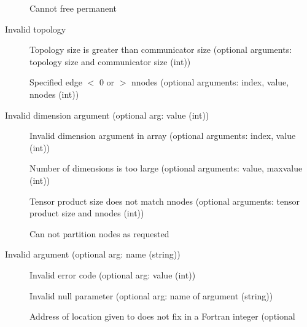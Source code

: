 \begin{description}
\begin{description}
    \item[ ]Cannot free
    permanent  
    \end{description}
\item[\mpiconst{MPI_ERR_TOPOLOGY} \emsg{topology}]Invalid topology
    \begin{description}
    \item[
    ]Topology size is greater than 
      communicator size (optional arguments: topology size and communicator
      size (int))
    \item[
    ]Specified edge $<$ 0 
      or $>$ nnodes (optional arguments: index, value, nnodes (int))
    \end{description}
\item[\mpiconst{MPI_ERR_DIMS} \emsg{dims}]Invalid dimension argument
    (optional arg: value (int)) 
    \begin{description}
    \item[ ]Invalid
    dimension argument in array 
      (optional arguments: index, value (int))
    \item[ ]Number of
    dimensions is too large 
      (optional arguments: value, maxvalue (int))
    \item[
    ]Tensor product size does not 
      match nnodes (optional arguments: tensor product size and nnodes (int))
    \item[ ]Can
    not partition nodes as 
      requested 
    \end{description}
\item[\mpiconst{MPI_ERR_ARG} \emsg{arg}]Invalid argument (optional
    arg: name (string)) 
    \begin{description}
    \item[ ]Invalid
    error code (optional arg: 
      value (int))
    \item[ ]Invalid null
    parameter (optional arg: 
      name of argument (string))
    \item[
    ]Address of location given to 
       does not fix in a Fortran integer (optional

\end{description}
\end{description}

